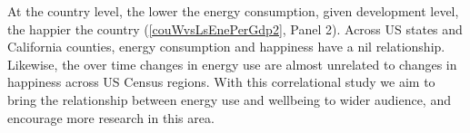 \documentclass[10pt, letterpaper]{article}
\begin{document}
\begin{spacing}{1.5}

%

At the country level,  the lower the energy consumption, given development
level, the happier the country (\ref{couWvsLsEnePerGdp2}, Panel 2).  Across US states and California counties,
energy consumption and happiness have a nil relationship. 
Likewise, the over time changes in energy use are almost unrelated to changes in
 happiness across US Census regions. 
With this correlational study we aim to bring the relationship between energy
use and wellbeing to wider audience, and encourage more research in this area. 


\end{spacing}
\end{document}
